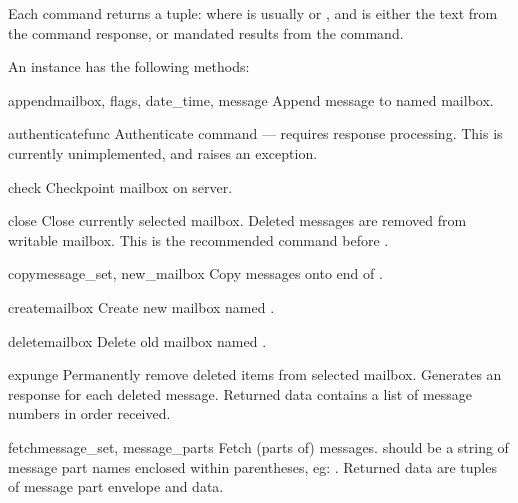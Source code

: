 Each command returns a tuple:  where  is usually  or ,
and  is either the text from the command response, or
mandated results from the command.

An  instance has the following methods:


\begin{methoddesc}{append}{mailbox, flags, date_time, message}
  Append message to named mailbox. 
\end{methoddesc}

\begin{methoddesc}{authenticate}{func}
  Authenticate command --- requires response processing. This is
  currently unimplemented, and raises an exception. 
\end{methoddesc}

\begin{methoddesc}{check}{}
  Checkpoint mailbox on server. 
\end{methoddesc}

\begin{methoddesc}{close}{}
  Close currently selected mailbox. Deleted messages are removed from
  writable mailbox. This is the recommended command before
  .
\end{methoddesc}

\begin{methoddesc}{copy}{message_set, new_mailbox}
  Copy  messages onto end of . 
\end{methoddesc}

\begin{methoddesc}{create}{mailbox}
  Create new mailbox named .
\end{methoddesc}

\begin{methoddesc}{delete}{mailbox}
  Delete old mailbox named .
\end{methoddesc}

\begin{methoddesc}{expunge}{}
  Permanently remove deleted items from selected mailbox. Generates an
   response for each deleted message. Returned data
  contains a list of  message numbers in order
  received.
\end{methoddesc}

\begin{methoddesc}{fetch}{message_set, message_parts}
  Fetch (parts of) messages.   should be
  a string of message part names enclosed within parentheses,
  eg: .  Returned data are tuples
  of message part envelope and data.
\end{methoddesc}

